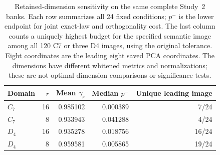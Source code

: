 \begin{table}[t]
\centering\small
\setlength{\tabcolsep}{5pt}
\begin{tabular}{@{}lrrrr@{}}
\toprule
Domain & $r$ & Mean $\gamma_r$ & Median $p^-$ & Unique leading image \\
\midrule
$C_7$ & 16 & 0.985102 & 0.000389 & 7/24 \\
$C_7$ & 8 & 0.933943 & 0.041288 & 4/24 \\
\addlinespace
$D_4$ & 16 & 0.935278 & 0.018756 & 16/24 \\
$D_4$ & 8 & 0.959581 & 0.005865 & 19/24 \\
\bottomrule
\end{tabular}
\caption{Retained-dimension sensitivity on the same complete Study~2 banks. Each row summarizes all 24 fixed conditions; $p^-$ is the lower endpoint for joint exact-law and orthogonality cost. The last column counts a uniquely highest budget for the specified semantic image among all 120 C7 or three D4 images, using the original tolerance. Eight coordinates are the leading eight saved PCA coordinates. The dimensions have different whitened metrics and normalizations; these are not optimal-dimension comparisons or significance tests.}
\label{tab:sensitivity-main}
\end{table}
